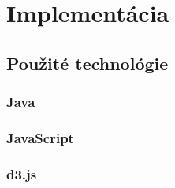 \chapter{Implementácia}

\section{Použité technológie}

\subsection{Java}

\subsection{JavaScript}

\subsection{d3.js}
